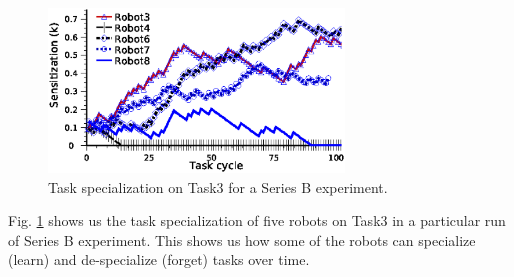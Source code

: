 \documentclass[smallcondensed]{svjour3}
\begin{document}
\begin{figure}
\centering
\includegraphics[width=0.7\textwidth, angle=0]{images/TaskSpecialization-task3-10may-1.eps}
\caption{Task specialization on Task3 for a Series B experiment.}
\label{fig:k-single-task-SB} 
\end{figure}
Fig. \ref{fig:k-single-task-SB} shows us the task specialization of five robots on Task3 in a particular run of Series B experiment. This shows us how some of the robots can specialize (learn) and de-specialize (forget) tasks over time.
\end{document}
